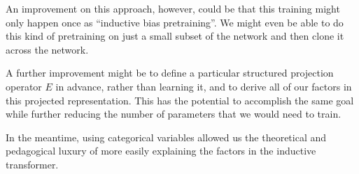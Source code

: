 \documentclass{article}
\begin{document}
An improvement on this approach, however, could be that this training might only happen once as ``inductive bias pretraining''.  We might even be able to do this kind of pretraining on just a small subset of the network and then clone it across the network.

A further improvement might be to define a particular structured projection operator $E$ in advance, rather than learning it, and to derive all of our factors in this projected representation. This has the potential to accomplish the same goal while further reducing the number of parameters that we would need to train.

In the meantime, using categorical variables allowed us the theoretical and pedagogical luxury of more easily explaining the factors in the inductive transformer.
\end{document}
